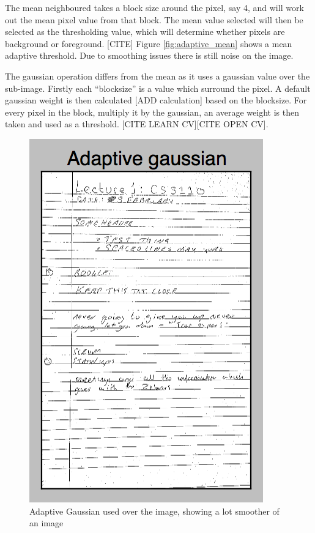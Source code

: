 The mean neighboured takes a block size around the pixel, say 4, and will work out the mean pixel value from that block. The mean value selected will then be selected as the thresholding value, which will determine whether pixels are background or foreground. [CITE] Figure \ref{fig:adaptive_mean} shows a mean adaptive threshold. Due to smoothing issues there is still noise on the image.

The gaussian operation differs from the mean as it uses a gaussian value over the sub-image. Firstly each ``blocksize'' is a value which surround the pixel. A default gaussian weight is then calculated [ADD calculation] based on the blocksize. For every pixel in the block, multiply it by the gaussian, an average weight is then taken and used as a threshold. [CITE LEARN CV][CITE OPEN CV].


\begin{figure}[H]
  \centering
  \includegraphics{images/adaptive_gaussian}
  \caption{Adaptive Gaussian used over the image, showing a lot smoother of an image}
  \label{fig:adaptive_gaussian}
\end{figure}

